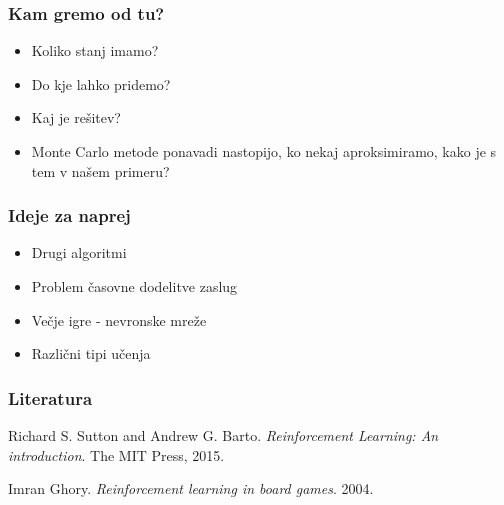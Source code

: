\documentclass{beamer}    %
\begin{document}
\begin{frame}
    \frametitle{Kam gremo od tu?}
    \begin{itemize}
        \item Koliko stanj imamo?
        \item Do kje lahko pridemo?
        \item Kaj je rešitev?
        \medskip 
        \medskip
        \medskip
        \item Monte Carlo metode ponavadi nastopijo, ko nekaj aproksimiramo, 
                kako je s tem v našem primeru?
    \end{itemize}
\end{frame}


\begin{frame}
    \frametitle{Ideje za naprej}
    \begin{itemize}
        \item Drugi algoritmi
        \item Problem časovne dodelitve zaslug
        \item Večje igre - nevronske mreže
        \item Različni tipi učenja 
    \end{itemize}
\end{frame}


\begin{frame}
    \frametitle{Literatura}
    \begin{thebibliography}{9}
        Richard S. Sutton and Andrew G. Barto. 
    \textit{Reinforcement Learning: An introduction}.
    The MIT Press, 
    2015.

    \medskip
    \medskip

    Imran Ghory.
    \textit{Reinforcement learning in board games}.
    2004.

    \end{thebibliography}
\end{frame}
\end{document}
